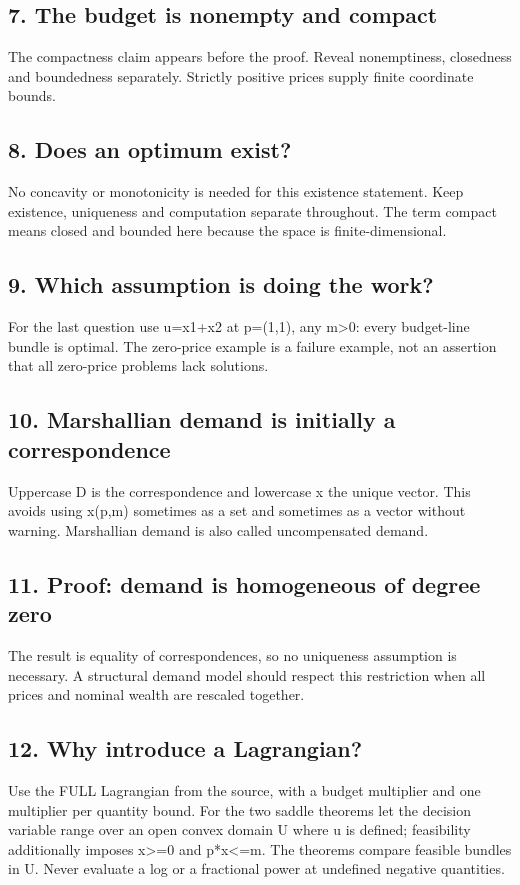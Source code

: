 \documentclass[11pt,a4paper]{article}
\begin{document}
\subsection*{7. The budget is nonempty and compact}
The compactness claim appears before the proof. Reveal nonemptiness, closedness and boundedness separately. Strictly positive prices supply finite coordinate bounds.

\subsection*{8. Does an optimum exist?}
No concavity or monotonicity is needed for this existence statement. Keep existence, uniqueness and computation separate throughout. The term compact means closed and bounded here because the space is finite-dimensional.

\subsection*{9. Which assumption is doing the work?}
For the last question use u=x1+x2 at p=(1,1), any m>0: every budget-line bundle is optimal. The zero-price example is a failure example, not an assertion that all zero-price problems lack solutions.

\subsection*{10. Marshallian demand is initially a correspondence}
Uppercase D is the correspondence and lowercase x the unique vector. This avoids using x(p,m) sometimes as a set and sometimes as a vector without warning. Marshallian demand is also called uncompensated demand.

\subsection*{11. Proof: demand is homogeneous of degree zero}
The result is equality of correspondences, so no uniqueness assumption is necessary. A structural demand model should respect this restriction when all prices and nominal wealth are rescaled together.

\subsection*{12. Why introduce a Lagrangian?}
Use the FULL Lagrangian from the source, with a budget multiplier and one multiplier per quantity bound. For the two saddle theorems let the decision variable range over an open convex domain U where u is defined; feasibility additionally imposes x>=0 and p*x<=m. The theorems compare feasible bundles in U. Never evaluate a log or a fractional power at undefined negative quantities.
\end{document}
